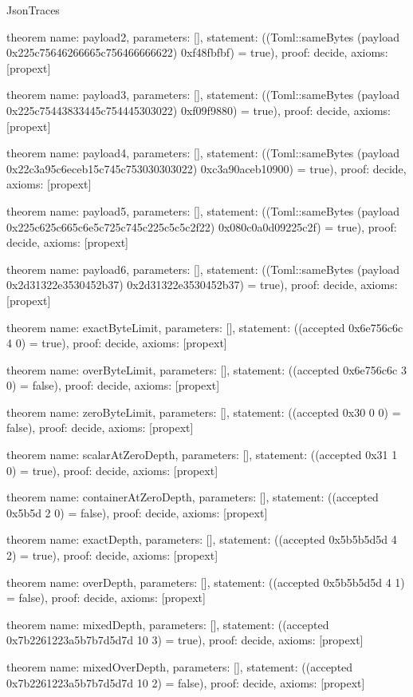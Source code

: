 \begin{lexlean}{JsonTraces}
\begin{semanticmodule}
theorem{
  name: payload2,
  parameters: [],
  statement: ((Toml::sameBytes (payload 0x225c75646266665c756466666622) 0xf48fbfbf) = true),
  proof: decide{},
  axioms: [propext]
}

theorem{
  name: payload3,
  parameters: [],
  statement: ((Toml::sameBytes (payload 0x225c75443833445c754445303022) 0xf09f9880) = true),
  proof: decide{},
  axioms: [propext]
}

theorem{
  name: payload4,
  parameters: [],
  statement: ((Toml::sameBytes (payload 0x22c3a95c6eceb15c745c753030303022) 0xc3a90aceb10900) = true),
  proof: decide{},
  axioms: [propext]
}

theorem{
  name: payload5,
  parameters: [],
  statement: ((Toml::sameBytes (payload 0x225c625c665c6e5c725c745c225c5c5c2f22) 0x080c0a0d09225c2f) = true),
  proof: decide{},
  axioms: [propext]
}

theorem{
  name: payload6,
  parameters: [],
  statement: ((Toml::sameBytes (payload 0x2d31322e3530452b37) 0x2d31322e3530452b37) = true),
  proof: decide{},
  axioms: [propext]
}

theorem{
  name: exactByteLimit,
  parameters: [],
  statement: ((accepted 0x6e756c6c 4 0) = true),
  proof: decide{},
  axioms: [propext]
}

theorem{
  name: overByteLimit,
  parameters: [],
  statement: ((accepted 0x6e756c6c 3 0) = false),
  proof: decide{},
  axioms: [propext]
}

theorem{
  name: zeroByteLimit,
  parameters: [],
  statement: ((accepted 0x30 0 0) = false),
  proof: decide{},
  axioms: [propext]
}

theorem{
  name: scalarAtZeroDepth,
  parameters: [],
  statement: ((accepted 0x31 1 0) = true),
  proof: decide{},
  axioms: [propext]
}

theorem{
  name: containerAtZeroDepth,
  parameters: [],
  statement: ((accepted 0x5b5d 2 0) = false),
  proof: decide{},
  axioms: [propext]
}

theorem{
  name: exactDepth,
  parameters: [],
  statement: ((accepted 0x5b5b5d5d 4 2) = true),
  proof: decide{},
  axioms: [propext]
}

theorem{
  name: overDepth,
  parameters: [],
  statement: ((accepted 0x5b5b5d5d 4 1) = false),
  proof: decide{},
  axioms: [propext]
}

theorem{
  name: mixedDepth,
  parameters: [],
  statement: ((accepted 0x7b2261223a5b7b7d5d7d 10 3) = true),
  proof: decide{},
  axioms: [propext]
}

theorem{
  name: mixedOverDepth,
  parameters: [],
  statement: ((accepted 0x7b2261223a5b7b7d5d7d 10 2) = false),
  proof: decide{},
  axioms: [propext]
}


\end{semanticmodule}
\end{lexlean}
